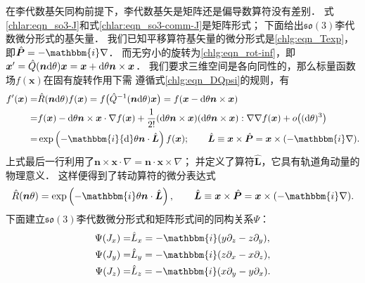 在李代数基矢同构前提下，李代数基矢是矩阵还是偏导数算符没有差别．
式\eqref{chlar:eqn_so3-J}和式\eqref{chlar:eqn_so3-comm-J}是矩阵形式；
下面给出$\mathfrak{so}(3)$李代数微分形式的基矢量．
我们已知平移算符基矢量的微分形式是\eqref{chlg:eqn_Texp}，
即$\hat{\boldsymbol{P}}= -\mathbbm{i}\nabla$．
而无穷小的旋转为\eqref{chlg:eqn_rot-inf}，即
$\boldsymbol{x}' = \hat{Q}(\boldsymbol{n}{\rm d}\theta) \boldsymbol{x} 
= \boldsymbol{x} +  {\rm d}\theta\boldsymbol{n}\times \boldsymbol{x}$．
我们要求三维空间是各向同性的，那么标量函数场$f(\boldsymbol{x})$在固有旋转作用下需
遵循式\eqref{chlg:eqn_DQpsi}的规则，有
\begin{align*}
    f'(\boldsymbol{x})=&\hat{R}(\boldsymbol{n}{\rm d}\theta) f(\boldsymbol{x})
    = f \bigl( \hat{Q}^{-1}(\boldsymbol{n}{\rm d}\theta) \boldsymbol{x} \bigr)
    =f(\boldsymbol{x}-{\rm d}\theta\boldsymbol{n}\times \boldsymbol{x}) \\
    =&f(\boldsymbol{x}) - {\rm d}\theta\boldsymbol{n}\times \boldsymbol{x} \cdot \nabla f(\boldsymbol{x})
    +\frac{1}{2!}({\rm d}\theta\boldsymbol{n}\times \boldsymbol{x} ) 
    ({\rm d}\theta\boldsymbol{n}\times \boldsymbol{x} ): \nabla \nabla f(\boldsymbol{x})
    + o\bigl( ({\rm d}\theta)^3 \bigr) \\
    =&\exp\left( -\mathbbm{i} {\rm d}\theta \boldsymbol{n}\cdot \hat{\boldsymbol{L}} \right) f (\boldsymbol{x});\qquad
    \hat{\boldsymbol{L}}\equiv \boldsymbol{x} \times \hat{\boldsymbol{P}} = \boldsymbol{x} \times (-\mathbbm{i} \nabla) .
\end{align*}
上式最后一行利用了$\boldsymbol{n}\times \boldsymbol{x} \cdot \nabla= \boldsymbol{n}\cdot \boldsymbol{x} \times \nabla$；
并定义了算符$\hat{\boldsymbol{L}}$，它具有轨道角动量的物理意义．
这样便得到了转动算符的微分表达式
\begin{equation}\label{chlar:eqn_rot-diff}
    \hat{R}(\boldsymbol{n}\theta) = \exp\left( -\mathbbm{i} \theta \boldsymbol{n}\cdot \hat{\boldsymbol{L}} \right),
    \qquad \hat{\boldsymbol{L}}\equiv \boldsymbol{x} \times \hat{\boldsymbol{P}} = \boldsymbol{x} \times (-\mathbbm{i} \nabla) .
\end{equation}
下面建立$\mathfrak{so}(3)$李代数微分形式和矩阵形式间的同构关系$\Psi$：
\begin{equation}\label{chlar:eqn_so3-L}
    \begin{aligned}
    \Psi(J_x)=& \hat{L}_x = -\mathbbm{i} (y \partial_z - z \partial_y ), \\
    \Psi(J_y)=& \hat{L}_y = -\mathbbm{i} (z \partial_x - x \partial_z ),\\
    \Psi(J_z)=& \hat{L}_z = -\mathbbm{i} (x \partial_y - y \partial_x ).
\end{aligned}
\end{equation}
